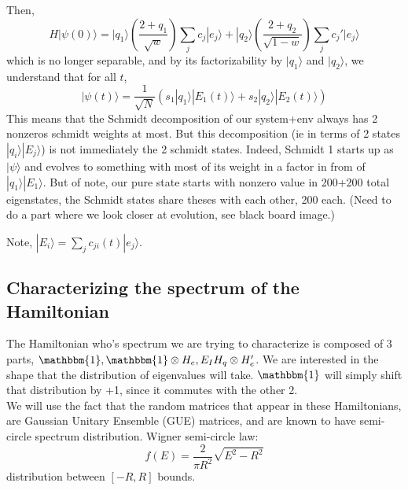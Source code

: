 \documentclass{article}
\begin{document}
Then,
\begin{equation}
    H|\psi(0)\rangle=|q_1\rangle(\frac{2+q_1}{\sqrt{w}})\sum_jc_j|e_j\rangle+|q_2\rangle(\frac{2+q_2}{\sqrt{1-w}})\sum_jc_j'|e_j\rangle
\end{equation}
which is no longer separable, and by its factorizability by $|q_1\rangle$ and $|q_2\rangle$, we understand that for all $t$,
\begin{equation}
    |\psi(t)\rangle=\frac{1}{\sqrt{N}}(s_1|q_1\rangle|E_1(t)\rangle+s_2|q_2\rangle|E_2(t)\rangle)
\end{equation}
This means that the Schmidt decomposition of our system+env always has 2 nonzeros schmidt weights at most. But this decomposition (ie in terms of 2 states $|q_i\rangle |E_j\rangle$) is not immediately the 2 schmidt states. Indeed, Schmidt 1 starts up as $|\psi\rangle$ and evolves to something with most of its weight in a factor in from of $|q_1\rangle|E_1\rangle$. But of note, our pure state starts with nonzero value in 200+200 total eigenstates, the Schmidt states share theses with each other, 200 each. (Need to do a part where we look closer at evolution, see black board image.)

Note, $|E_i\rangle=\sum_jc_{ji}(t)|e_j\rangle$.


\begin{comment}
Note that the weight in from of both states are equal if,
    \begin{equation}
        q_1=2(\frac{\sqrt{w}}{\sqrt{1-w}}-1)+q_2\frac{\sqrt{w}}{\sqrt{1-w}}
    \end{equation}
\end{comment}

\subsection{Characterizing the spectrum of the Hamiltonian}
The Hamiltonian who's spectrum we are trying to characterize is composed of 3 parts, $\mathbbm{1}, \mathbbm{1}\otimes H_e,E_IH_q\otimes H_e'$. We are interested in the shape that the distribution of eigenvalues will take. $\mathbbm{1}$ will simply shift that distribution by +1, since it commutes with the other 2. \\

We will use the fact that the random matrices that appear in these Hamiltonians, are Gaussian Unitary Ensemble (GUE) matrices, and are known to have semi-circle spectrum distribution.
Wigner semi-circle law:
\begin{equation}
    f(E)=\frac{2}{\pi R^2}\sqrt{E^2-R^2}
\end{equation}
distribution between $[-R,R]$ bounds.\\
\end{document}
